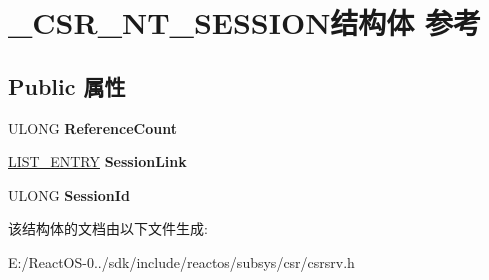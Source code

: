 \hypertarget{struct___c_s_r___n_t___s_e_s_s_i_o_n}{}\section{\+\_\+\+C\+S\+R\+\_\+\+N\+T\+\_\+\+S\+E\+S\+S\+I\+O\+N结构体 参考}
\label{struct___c_s_r___n_t___s_e_s_s_i_o_n}
\subsection*{Public 属性}
\begin{DoxyCompactItemize}
\item 
\mbox{\label{struct___c_s_r___n_t___s_e_s_s_i_o_n_ad296980e4fde454798888247fa9f7ce3}} 
U\+L\+O\+NG {\bfseries Reference\+Count}
\item 
\mbox{\label{struct___c_s_r___n_t___s_e_s_s_i_o_n_abed6721464512054115134a865087f60}} 
\hyperlink{struct___l_i_s_t___e_n_t_r_y}{L\+I\+S\+T\+\_\+\+E\+N\+T\+RY} {\bfseries Session\+Link}
\item 
\mbox{\label{struct___c_s_r___n_t___s_e_s_s_i_o_n_a57b5905992559f17fadaae551bbb8683}} 
U\+L\+O\+NG {\bfseries Session\+Id}
\end{DoxyCompactItemize}


该结构体的文档由以下文件生成\+:\begin{DoxyCompactItemize}
\item 
E\+:/\+React\+O\+S-\/0../sdk/include/reactos/subsys/csr/csrsrv.\+h\end{DoxyCompactItemize}
